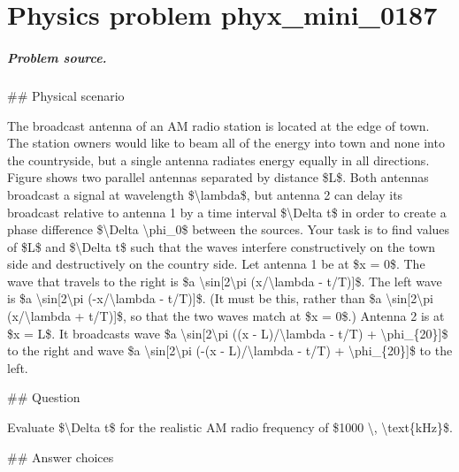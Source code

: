 
\chapter{Physics problem phyx\_mini\_0187}
\label{ch:PhyXMiniProblems_problem_phyx_mini_0187}

\paragraph{Problem source.}
\#\# Physical scenario

The broadcast antenna of an AM radio station is located at the edge of town. The station owners would like to beam all of the energy into town and none into the countryside, but a single antenna radiates energy equally in all directions. Figure shows two parallel antennas separated by distance \$L\$. Both antennas broadcast a signal at wavelength \$\textbackslash{}lambda\$, but antenna 2 can delay its broadcast relative to antenna 1 by a time interval \$\textbackslash{}Delta t\$ in order to create a phase difference \$\textbackslash{}Delta \textbackslash{}phi\_0\$ between the sources. Your task is to find values of \$L\$ and \$\textbackslash{}Delta t\$ such that the waves interfere constructively on the town side and destructively on the country side. Let antenna 1 be at \$x = 0\$. The wave that travels to the right is \$a \textbackslash{}sin[2\textbackslash{}pi (x/\textbackslash{}lambda - t/T)]\$. The left wave is \$a \textbackslash{}sin[2\textbackslash{}pi (-x/\textbackslash{}lambda - t/T)]\$. (It must be this, rather than \$a \textbackslash{}sin[2\textbackslash{}pi (x/\textbackslash{}lambda + t/T)]\$, so that the two waves match at \$x = 0\$.) Antenna 2 is at \$x = L\$. It broadcasts wave \$a \textbackslash{}sin[2\textbackslash{}pi ((x - L)/\textbackslash{}lambda - t/T) + \textbackslash{}phi\_\{20\}]\$ to the right and wave \$a \textbackslash{}sin[2\textbackslash{}pi (-(x - L)/\textbackslash{}lambda - t/T) + \textbackslash{}phi\_\{20\}]\$ to the left.

\#\# Question

Evaluate  \$\textbackslash{}Delta t\$ for the realistic AM radio frequency of \$1000 \textbackslash{}, \textbackslash{}text\{kHz\}\$.

\#\# Answer choices

